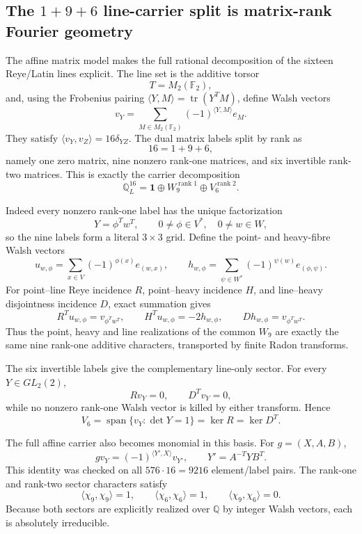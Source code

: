 \subsection{The $1+9+6$ line-carrier split is matrix-rank Fourier geometry}
\label{sec:pass5816-5823-matrix-fourier-rank}

The affine matrix model makes the full rational decomposition of the sixteen
Reye/Latin lines explicit.  The line set is the additive torsor
\[
 T=M_2(\mathbb F_2),
\]
and, using the Frobenius pairing
$\langle Y,M\rangle=\operatorname{tr}(Y^TM)$, define Walsh vectors
\[
 \boxed{
 v_Y=\sum_{M\in M_2(\mathbb F_2)}
 (-1)^{\langle Y,M\rangle}e_M.
 }
\]
They satisfy $\langle v_Y,v_Z\rangle=16\delta_{YZ}$.  The dual matrix labels
split by rank as
\[
 \boxed{16=1+9+6},
\]
namely one zero matrix, nine nonzero rank-one matrices, and six invertible
rank-two matrices.  This is exactly the carrier decomposition
\[
 \boxed{
 \mathbb Q^{16}_L
 =\mathbf1\oplus W_9^{\operatorname{rank}1}
 \oplus V_6^{\operatorname{rank}2}.
 }
\]

Indeed every nonzero rank-one label has the unique factorization
\[
 Y=\phi^Tw^T,
 \qquad0\ne\phi\in V^*,\quad0\ne w\in W,
\]
so the nine labels form a literal $3\times3$ grid.  Define the point- and
heavy-fibre Walsh vectors
\[
 u_{w,\phi}=\sum_{x\in V}(-1)^{\phi(x)}e_{(w,x)},
 \qquad
 h_{w,\phi}=\sum_{\psi\in W^*}(-1)^{\psi(w)}e_{(\phi,\psi)}.
\]
For point--line Reye incidence $R$, point--heavy incidence $H$, and
line--heavy disjointness incidence $D$, exact summation gives
\[
 \boxed{R^Tu_{w,\phi}=v_{\phi^Tw^T}},
 \qquad
 \boxed{H^Tu_{w,\phi}=-2h_{w,\phi}},
 \qquad
 \boxed{Dh_{w,\phi}=v_{\phi^Tw^T}}.
\]
Thus the point, heavy and line realizations of the common $W_9$ are exactly the
same nine rank-one additive characters, transported by finite Radon transforms.

The six invertible labels give the complementary line-only sector.  For every
$Y\in GL_2(2)$,
\[
 \boxed{Rv_Y=0},
 \qquad
 \boxed{D^Tv_Y=0},
\]
while no nonzero rank-one Walsh vector is killed by either transform.  Hence
\[
 \boxed{
 V_6=\operatorname{span}\{v_Y:\det Y=1\}
 =\ker R=\ker D^T.
 }
\]

The full affine carrier also becomes monomial in this basis.  For
$g=(X,A,B)$,
\[
 \boxed{
 gv_Y=(-1)^{\langle Y',X\rangle}v_{Y'},
 \qquad Y'=A^{-T}YB^T.
 }
\]
This identity was checked on all $576\cdot16=9216$ element/label pairs.  The
rank-one and rank-two sector characters satisfy
\[
 \boxed{\langle\chi_9,\chi_9\rangle=1},
 \qquad
 \boxed{\langle\chi_6,\chi_6\rangle=1},
 \qquad
 \boxed{\langle\chi_9,\chi_6\rangle=0}.
\]
Because both sectors are explicitly realized over $\mathbb Q$ by integer
Walsh vectors, each is absolutely irreducible.

